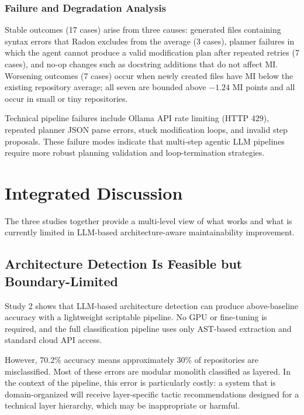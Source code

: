 \subsubsection*{Failure and Degradation Analysis}

Stable outcomes (17 cases) arise from three causes: generated files containing syntax errors that Radon excludes from the average (3 cases), planner failures in which the agent cannot produce a valid modification plan after repeated retries (7 cases), and no-op changes such as docstring additions that do not affect MI. Worsening outcomes (7 cases) occur when newly created files have MI below the existing repository average; all seven are bounded above $-1.24$ MI points and all occur in small or tiny repositories.

Technical pipeline failures include Ollama API rate limiting (HTTP 429), repeated planner JSON parse errors, stuck modification loops, and invalid step proposals. These failure modes indicate that multi-step agentic LLM pipelines require more robust planning validation and loop-termination strategies.


\section{Integrated Discussion}
\label{sec:eval_discussion}

The three studies together provide a multi-level view of what works and what is currently limited in LLM-based architecture-aware maintainability improvement.

\subsection{Architecture Detection Is Feasible but Boundary-Limited}

Study 2 shows that LLM-based architecture detection can produce above-baseline accuracy with a lightweight scriptable pipeline. No GPU or fine-tuning is required, and the full classification pipeline uses only AST-based extraction and standard cloud API access.

However, 70.2\% accuracy means approximately 30\% of repositories are misclassified. Most of these errors are modular monolith classified as layered. In the context of the pipeline, this error is particularly costly: a system that is domain-organized will receive layer-specific tactic recommendations designed for a technical layer hierarchy, which may be inappropriate or harmful.

